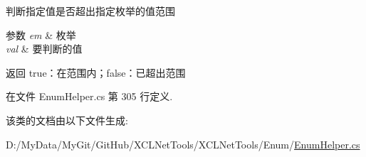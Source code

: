 判断指定值是否超出指定枚举的值范围 


\begin{DoxyParams}{参数}
{\em em} & 枚举\\
\hline
{\em val} & 要判断的值\\
\hline
\end{DoxyParams}
\begin{DoxyReturn}{返回}
true：在范围内；false：已超出范围
\end{DoxyReturn}


在文件 Enum\-Helper.\-cs 第 305 行定义.



该类的文档由以下文件生成\-:\begin{DoxyCompactItemize}
\item 
D\-:/\-My\-Data/\-My\-Git/\-Git\-Hub/\-X\-C\-L\-Net\-Tools/\-X\-C\-L\-Net\-Tools/\-Enum/\hyperlink{_enum_helper_8cs}{Enum\-Helper.\-cs}\end{DoxyCompactItemize}
